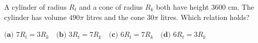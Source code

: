 A cylinder of radius $R_t$ and a cone of radius $R_k$ both have height $3600$ cm. The cylinder has volume $490\pi$ litres and the cone $30\pi$ litres. Which relation holds?

$\textbf{(a) }7R_t=3R_k\quad\textbf{(b) }3R_t=7R_k\quad\textbf{(c) }6R_t=7R_k\quad\textbf{(d) }6R_t=3R_k$
